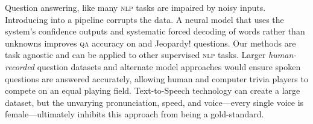 Question answering, like many \textsc{nlp} tasks are impaired by noisy inputs.
%
Introducing \asr{} into a  pipeline corrupts the data. 
%
A neural model that uses the \asr{} system's confidence outputs and systematic forced decoding of words rather than unknowns improves  \textsc{qa} accuracy on \qb{} and Jeopardy! questions.  
%
Our methods are task agnostic and can be applied to other supervised \textsc{nlp} tasks.
%
Larger \textit{human-recorded} question datasets and alternate model approaches
would ensure spoken questions are answered accurately, allowing human
and computer trivia players to compete on an equal playing field.
%
Text-to-Speech technology can create a large dataset, but the unvarying pronunciation, speed, and voice---every single  voice is female---ultimately inhibits this approach from being a gold-standard.  